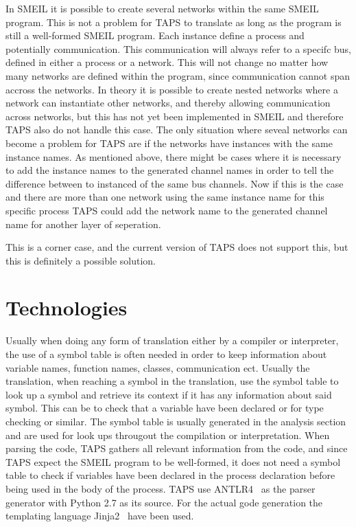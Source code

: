 In SMEIL it is possible to create several networks within the same SMEIL program. This is not a problem for TAPS to translate as long as the program is still a well-formed SMEIL program. Each instance define a process and potentially communication. This communication will always refer to a specifc bus, defined in either a process or a network. This will not change no matter how many networks are defined within the program, since communication cannot span accross the networks.
In theory it is possible to create nested networks where a network can instantiate other networks, and thereby allowing communication across networks, but this has not yet been implemented in SMEIL and therefore TAPS also do not handle this case.
The only situation where seveal networks can become a problem for TAPS are if the networks have instances with the same instance names. As mentioned above, there might be cases where it is necessary to add the instance names to the generated \cspm{} channel names in order to tell the difference between to instanced of the same bus channels. Now if this is the case and there are more than one network using the same instance name for this specific process TAPS could add the network name to the generated \cspm{} channel name for another layer of seperation.

This is a corner case, and the current version of TAPS does not support this, but this is definitely a possible solution.

\section{Technologies}

Usually when doing any form of translation either by a compiler or interpreter, the use of a symbol table is often needed in order to keep information about variable names, function names, classes, communication ect. Usually the translation, when reaching a symbol in the translation, use the symbol table to look up a symbol and retrieve its context if it has any information about said symbol. This can be to check that a variable have been declared or for type checking or similar. The symbol table is usually generated in the analysis section and are used for look ups througout the compilation or interpretation. When parsing the code, TAPS gathers all relevant information from the code, and since TAPS expect the SMEIL program to be well-formed, it does not need a symbol table to check if variables have been declared in the process declaration before being used in the body of the process.
TAPS use ANTLR4~\cite{antlr} as the parser generator with Python 2.7 as its source.
For the actual gode generation the templating language Jinja2~\cite{jinja2} have been used.

